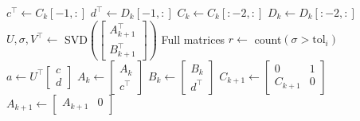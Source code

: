 \documentclass[doctype=mastersthesis,BCOR=15mm,biblatex]{ldvbook}%
\begin{document}
\begin{algorithm}[htb]
	\begin{algorithmic}

		\State $c^\top \gets C_{k}[-1,:]$
		\State $d^\top \gets D_{k}[-1,:]$
		\State $C_{k} \gets C_{k}[:-2,:]$
		\State $D_{k} \gets D_{k}[:-2,:]$
		\State $U,\sigma,V^\top \gets$ SVD$\left(\begin{bmatrix}
		A_{k+1}^\top\\B_{k+1}^\top
		\end{bmatrix}\right)$ Full matrices 
		\State $r \gets $ count$(\sigma>\text{tol}_i)$
\State $a \gets U^\top \begin{bmatrix}
c\\d
\end{bmatrix}$
\State $A_k \gets \begin{bmatrix}
A_k \\ c^\top
\end{bmatrix}$
\State $B_k \gets \begin{bmatrix}
B_k \\ d^\top
\end{bmatrix}$
\State $C_{k+1} \gets \begin{bmatrix}
0 & 1\\ C_{k+1} & 0
\end{bmatrix}$
\State $A_{k+1} \gets \begin{bmatrix}
A_{k+1} & 0
\end{bmatrix}$


\end{algorithmic}
\end{algorithm}
\end{document}
